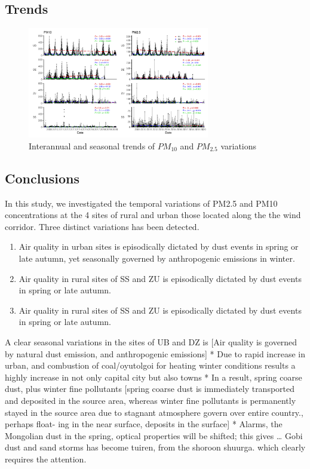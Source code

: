 \documentclass[
  11pt,
]{article}
\begin{document}
\newpage
\subsection{Trends}

\begin{figure}
\centering
\includegraphics[width=3.125in,height=\textheight,keepaspectratio]{images/figure_8.png}
\caption{Interannual and seasonal trends of \(PM_{10}\) and \(PM_{2.5}\)
variations}
\end{figure}

\newpage

\subsection{Conclusions}\label{conclusions}

In this study, we investigated the temporal variations of PM2.5 and PM10
concentrations at the 4 sites of rural and urban those located along the
the wind corridor. Three distinct variations has been detected.

\begin{enumerate}
    \item Air quality in urban sites is episodically dictated by dust events in spring or late autumn, yet seasonally governed by anthropogenic emissions in winter.
    \item Air quality in rural sites of SS and ZU is episodically dictated by dust events in spring or late autumn.
    \item Air quality in rural sites of SS and ZU is episodically dictated by dust events in spring or late autumn.
\end{enumerate}

A clear seasonal variations in the sites of UB and DZ is {[}Air quality
is governed by natural dust emission, and anthropogenic emissions{]} *
Due to rapid increase in urban, and combustion of coal/oyutolgoi for
heating winter conditions results a highly increase in not only capital
city but also towns * In a result, spring coarse dust, plus winter fine
pollutants {[}spring coarse dust is immediately transported and
deposited in the source area, whereas winter fine pollutants is
permanently stayed in the source area due to stagnant atmosphere govern
over entire country., perhaps float- ing in the near surface, deposits
in the surface{]} * Alarms, the Mongolian dust in the spring, optical
properties will be shifted; this gives \ldots{} Gobi dust and sand
storms has become tuiren, from the shoroon shuurga. which clearly
requires the attention.
\end{document}
